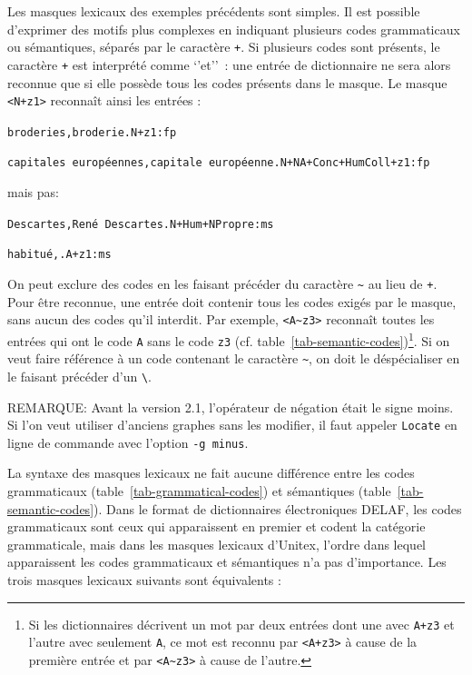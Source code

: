 Les masques lexicaux des exemples précédents sont simples. Il est possible d’exprimer des
motifs plus complexes en indiquant plusieurs codes grammaticaux ou sémantiques, séparés
par le caractère \verb$+$. Si plusieurs codes sont présents, le caractère \verb$+$ est interprété
comme `'et''~: une entrée de dictionnaire ne sera alors reconnue que si elle 
possède tous les codes présents dans le masque.
 Le masque \verb$<N+z1>$ reconnaît ainsi les entrées :

\bigskip
\noindent
\texttt{broderies,broderie.N+z1:fp}

\noindent
\texttt{capitales europ\'eennes,capitale europ\'eenne.N+NA+Conc+HumColl+z1:fp}

\bigskip
\noindent mais pas:

\bigskip
\noindent
\texttt{Descartes,Ren\'e Descartes.N+Hum+NPropre:ms}

\noindent
\texttt{habitu\'e,.A+z1:ms}

\bigskip
\noindent On peut exclure des codes en les faisant précéder du caractère \verb+~+
au lieu de \verb$+$.\index{\verbt{\textasciitilde~}}
Pour être reconnue, une entrée doit contenir tous les codes exigés par le
masque, sans aucun des codes qu'il interdit. Par exemple, \verb$<A~z3>$ reconnaît toutes les
entrées qui ont le code \verb+A+ sans le
code \verb+z3+ (cf. table~\ref{tab-semantic-codes})\footnote{Si les dictionnaires décrivent un
mot par deux entrées dont une avec \texttt{A+z3} et l'autre avec seulement \texttt{A}, ce mot est
reconnu par \texttt{<A+z3>} à cause de la première entrée et par
\texttt{<A{\textasciitilde}z3>} à cause de l'autre.}.
Si on veut faire référence à un code
contenant le caractère \verb$~$, on doit le déspécialiser en le faisant précéder d'un \verb+\+.

\bigskip
\noindent REMARQUE: Avant la version 2.1, l'opérateur de négation était le signe moins. Si l'on veut
utiliser d'anciens graphes sans les modifier, il faut appeler \verb+Locate+ en ligne de commande
avec l'option \verb+-g minus+.

\bigskip
\noindent La syntaxe des masques lexicaux ne fait aucune différence entre les codes grammaticaux
(table~\ref{tab-grammatical-codes}) et sémantiques (table~\ref{tab-semantic-codes}). Dans le
format de dictionnaires électroniques DELAF, les codes grammaticaux sont ceux qui apparaissent
en premier et codent la catégorie grammaticale, mais dans les masques lexicaux d'Unitex, l'ordre
dans lequel apparaissent les codes grammaticaux et sémantiques n'a pas d'importance. Les
trois masques lexicaux suivants sont équivalents :

